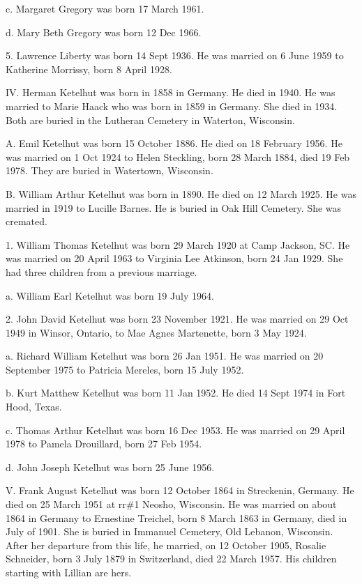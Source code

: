 \documentclass[a4paper]{article}
\begin{document}
c. Margaret Gregory was born 17 March 1961.

d. Mary Beth Gregory was born 12 Dec 1966.

5. Lawrence Liberty was born 14 Sept 1936.  He was married on 6 June 1959 to Katherine Morrissy, born 8 April 1928.

IV. Herman Ketelhut was born in 1858 in Germany.  He died in 1940.  He was married to Marie Haack who was born in 1859 in Germany.  She died in 1934.  Both are buried in the Lutheran Cemetery in Waterton, Wisconsin.

A. Emil  Ketelhut was born 15 October 1886.  He died on 18 February 1956.  He was married on 1 Oct 1924 to Helen Steckling, born 28 March 1884, died 19 Feb 1978. They are buried in Watertown, Wisconsin.

B. William Arthur Ketelhut was born in 1890.  He died on 12 March 1925.  He was married in 1919 to Lucille Barnes.  He is buried in Oak Hill Cemetery.  She was cremated.

1. William Thomas Ketelhut was born 29 March 1920 at Camp Jackson, SC.  He was married on 20 April 1963 to Virginia Lee Atkinson, born 24 Jan 1929.  She had three children from a previous marriage.  

a. William Earl Ketelhut was born 19 July 1964.

2. John David Ketelhut was born 23 November 1921.  He was married on 29 Oct 1949 in Winsor, Ontario, to Mae Agnes Martenette, born 3 May 1924.

a. Richard William Ketelhut was born 26 Jan 1951.  He was married on 20 September 1975 to Patricia Mereles, born 15 July 1952.

b. Kurt Matthew Ketelhut was born 11 Jan 1952.  He died 14 Sept 1974 in Fort Hood, Texas.  

c. Thomas Arthur Ketelhut was born 16 Dec 1953.  He was married on 29 April 1978 to Pamela Drouillard, born 27 Feb 1954.

d. John Joseph Ketelhut was born 25 June 1956.

V. Frank August Ketelhut was born 12 October 1864 in Streckenin, Germany.  He died on 25 March 1951 at rr\#1 Neosho, Wisconsin.  He was married on about 1864 in Germany to Ernestine Treichel, born 8 March 1863 in Germany, died in July of 1901.  She is buried in Immanuel Cemetery,  Old Lebanon, Wisconsin.  After her departure from this life, he married, on 12 October 1905, Rosalie Schneider, born 3 July 1879 in Switzerland, died 22 March 1957.  His children starting with Lillian are hers.
\end{document}
